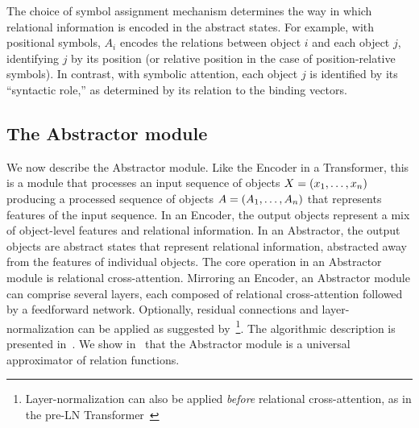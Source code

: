 
The choice of symbol assignment mechanism determines the way in which relational information is encoded in the abstract states. For example, with positional symbols, $A_i$ encodes the relations between object $i$ and each object $j$, identifying $j$ by its position (or relative position in the case of position-relative symbols). In contrast, with symbolic attention, each object $j$ is identified by its ``syntactic role,'' as determined by its relation to the binding vectors.

\subsection{The Abstractor module}\label{ssec:abstractor_module}

We now describe the Abstractor module. Like the Encoder in a Transformer, this is a module that processes an input sequence of objects $X = \left(x_1, \ldots, x_n\right)$ producing a processed sequence of objects $A = \left(A_1, \ldots, A_n\right)$ that represents features of the input sequence. In an Encoder, the output objects represent a mix of object-level features and relational information. In an Abstractor, the output objects are abstract states that represent relational information, abstracted away from the features of individual objects. The core operation in an Abstractor module is relational cross-attention. Mirroring an Encoder, an Abstractor module can comprise several layers, each composed of relational cross-attention followed by a feedforward network. Optionally, residual connections and layer-normalization can be applied as suggested by~\citet{vaswani2017attention}\footnote{Layer-normalization can also be applied \textit{before} relational cross-attention, as in the pre-LN Transformer~\citep{xiong2020layer}}. The algorithmic description is presented in~. We show in~ that the Abstractor module is a universal approximator of relation functions.

